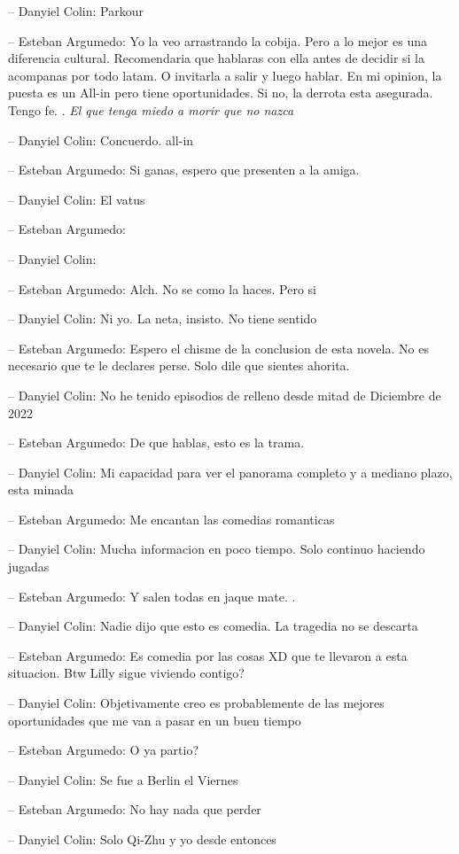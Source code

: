 -- Danyiel Colin: Parkour

-- Esteban Argumedo: Yo la veo arrastrando la cobija. Pero a lo mejor es
una diferencia cultural. Recomendaria que hablaras con ella antes de
decidir si la acompanas por todo latam. O invitarla a salir y luego
hablar. En mi opinion, la puesta es un All-in pero tiene oportunidades.
Si no, la derrota esta asegurada. Tengo fe. . \emph{El que tenga miedo a
morir que no nazca}

-- Danyiel Colin: Concuerdo. all-in

-- Esteban Argumedo: Si ganas, espero que presenten a la amiga.

-- Danyiel Colin: El vatus

-- Esteban Argumedo:

-- Danyiel Colin:

-- Esteban Argumedo: Alch. No se como la haces. Pero si

-- Danyiel Colin: Ni yo. La neta, insisto. No tiene sentido

-- Esteban Argumedo: Espero el chisme de la conclusion de esta novela.
No es necesario que te le declares perse. Solo dile que sientes ahorita.

-- Danyiel Colin: No he tenido episodios de relleno desde mitad de
Diciembre de 2022

-- Esteban Argumedo: De que hablas, esto es la trama.

-- Danyiel Colin: Mi capacidad para ver el panorama completo y a mediano
plazo, esta minada

-- Esteban Argumedo: Me encantan las comedias romanticas

-- Danyiel Colin: Mucha informacion en poco tiempo. Solo continuo
haciendo jugadas

-- Esteban Argumedo: Y salen todas en jaque mate. .

-- Danyiel Colin: Nadie dijo que esto es comedia. La tragedia no se
descarta

-- Esteban Argumedo: Es comedia por las cosas XD que te llevaron a esta
situacion. Btw Lilly sigue viviendo contigo?

-- Danyiel Colin: Objetivamente creo es probablemente de las mejores
oportunidades que me van a pasar en un buen tiempo

-- Esteban Argumedo: O ya partio?

-- Danyiel Colin: Se fue a Berlin el Viernes

-- Esteban Argumedo: No hay nada que perder

-- Danyiel Colin: Solo Qi-Zhu y yo desde entonces

